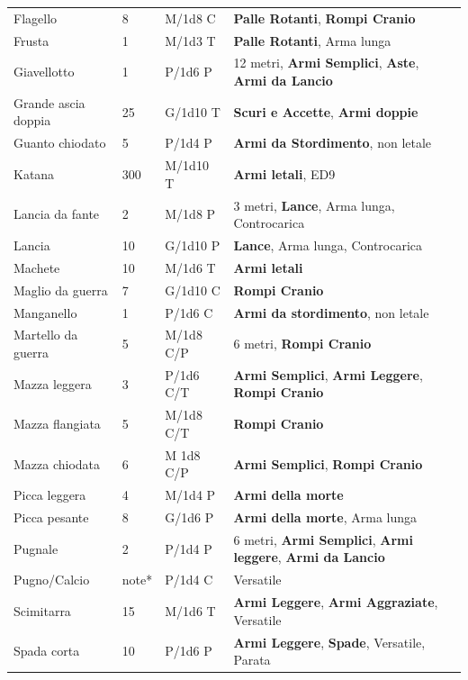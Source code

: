 \begin{xltabular}{1\textwidth}{lllX}
Flagello& 8& M/1d8 C& \textbf{Palle Rotanti}, \textbf{Rompi Cranio}\\
Frusta& 1& M/1d3 T& \textbf{Palle Rotanti}, Arma lunga\\
Giavellotto& 1& P/1d6 P& 12 metri, \textbf{Armi Semplici}, \textbf{Aste}, \textbf{Armi da Lancio}\\
Grande ascia doppia& 25 & G/1d10 T& \textbf{Scuri e Accette}, \textbf{Armi doppie}\\
Guanto chiodato& 5& P/1d4 P&\textbf{Armi da Stordimento}, non letale\\
Katana& 300& M/1d10 T& \textbf{Armi letali}, ED9\\
Lancia da fante& 2& M/1d8 P&3 metri, \textbf{Lance}, Arma lunga, Controcarica\\
Lancia& 10 & G/1d10 P&\textbf{Lance}, Arma lunga, Controcarica\\
Machete& 10 & M/1d6 T&\textbf{Armi letali}\\
Maglio da guerra& 7& G/1d10 C& \textbf{Rompi Cranio}\\
Manganello& 1& P/1d6 C& \textbf{Armi da stordimento}, non letale\\
Martello da guerra& 5& M/1d8 C/P& 6 metri, \textbf{Rompi Cranio}\\
Mazza leggera& 3& P/1d6 C/T& \textbf{Armi Semplici}, \textbf{Armi Leggere}, \textbf{Rompi Cranio} \\
Mazza flangiata& 5& M/1d8 C/T& \textbf{Rompi Cranio}\\
Mazza chiodata& 6& M 1d8 C/P& \textbf{Armi Semplici}, \textbf{Rompi Cranio}\\
Picca leggera& 4& M/1d4 P&\textbf{Armi della morte}\\
Picca pesante& 8& G/1d6 P&\textbf{Armi della morte}, Arma lunga\\
Pugnale& 2& P/1d4 P& 6 metri, \textbf{Armi Semplici}, \textbf{Armi leggere}, \textbf{Armi da Lancio}\\
Pugno/Calcio & note*& P/1d4 C&Versatile\\
Scimitarra& 15 & M/1d6 T&\textbf{Armi Leggere}, \textbf{Armi Aggraziate}, Versatile\\
Spada corta& 10 & P/1d6 P&\textbf{Armi Leggere}, \textbf{Spade}, Versatile, Parata\\

\end{xltabular}
